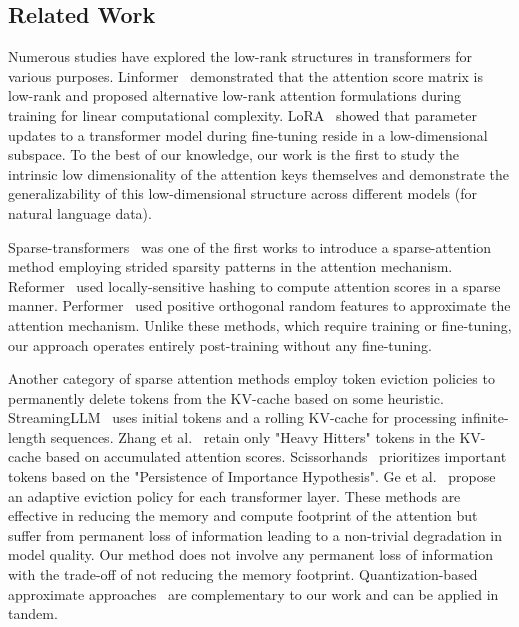\subsection{Related Work}

Numerous studies have explored the low-rank structures in transformers for
various purposes. Linformer~\citep{wang2020linformer} demonstrated that the
attention score matrix is low-rank and proposed alternative low-rank attention
formulations during training for linear computational complexity.
LoRA~\citep{lora} showed that parameter updates to a transformer model during
fine-tuning reside in a low-dimensional subspace. To the best of our knowledge,
our work is the first to study the intrinsic low dimensionality of the
attention keys themselves and demonstrate the generalizability of this
low-dimensional structure across different models (for natural language data).

Sparse-transformers~\citep{child2019generating} was one of the first works to
introduce a sparse-attention method employing strided sparsity patterns in the
attention mechanism. Reformer~\citep{kitaev2020reformer} used locally-sensitive
hashing to compute attention scores in a sparse manner.
Performer~\citep{choromanski2022rethinking} used positive orthogonal random
features to approximate the attention mechanism. Unlike these methods, which
require training or fine-tuning, our approach operates entirely post-training
without any fine-tuning.

Another category of sparse attention methods employ token eviction policies to
permanently delete tokens from the KV-cache based on some heuristic.
StreamingLLM~\citep{xiao2023efficient} uses initial tokens and a rolling
KV-cache for processing infinite-length sequences. Zhang et
al.~\citep{zhang2023hH2O} retain only "Heavy Hitters" tokens in the KV-cache
based on accumulated attention scores. Scissorhands~\citep{liu2023scissorhands}
prioritizes important tokens based on the "Persistence of Importance
Hypothesis". Ge et al.~\citep{ge2023model} propose an adaptive eviction policy
for each transformer layer. These methods are effective in reducing the memory
and compute footprint of the attention but suffer from permanent loss of
information leading to a non-trivial degradation in model quality. Our method
does not involve any permanent loss of information with the trade-off of not
reducing the memory footprint. Quantization-based approximate
approaches~\citep{jacob2017quantization, nagel2021white} are complementary to
our work and can be applied in tandem.

